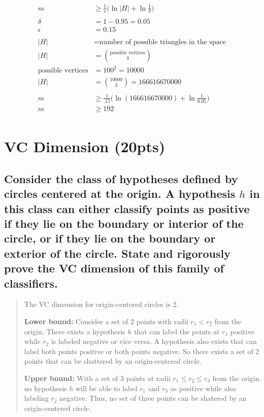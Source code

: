 \documentclass[11pt]{article}
\begin{document}
\begin{align*}
	m &\geq \frac{1}{\epsilon}\bigg(\ln \vert H \vert + \ln\frac{1}{\delta}\bigg)\\
	\\
	\delta &= 1-0.95 = 0.05\\
	\epsilon &= 0.15\\
	\\
	\vert H \vert &= \text{number of possible triangles in the space}\\
	\vert H \vert &= {{\text{possible vertices}}\choose{3}}\\
	\text{possible vertices} &= 100^2 = 10000\\
	\vert H \vert &= {{10000}\choose{3}}=166616670000\\
	\\
	m &\geq \frac{1}{.15}\bigg(\ln(166616670000) + \ln\frac{1}{0.05}\bigg)\\
	m &\geq 192\\
\end{align*}

\section{VC Dimension (20pts)}

\subsection{Consider the class of hypotheses defined by circles centered at the origin. A hypothesis $h$ in this class can either classify points as positive if they lie on the boundary or interior of the circle, or if they lie on the boundary or exterior of the circle. State and rigorously prove the VC dimension of this family of classifiers.}
\begin{quote}

	\vspace{3 mm}

	The VC dimension for origin-centered circles is 2.
	
	\vspace{1 mm}

	\textbf{Lower bound:} Consider a set of 2 points with radii $r_1 < r_2$ from the origin. There exists a hypothesis $h$ that can label the points at $r_1$ positive while $r_2$ is labeled negative or vice versa. A hypothesis also exists that can label both points positive or both points negative. So there exists a set of 2 points that can be shattered by an origin-centered circle. 
	
	\vspace{1 mm}

	\textbf{Upper bound:} With a set of 3 points at radii $r_1 \leq r_2 \leq r_3$ from the origin no hypothesis $h$ will be able to label $r_1$ and $r_3$ as positive while also labeling $r_2$ negative. Thus, no set of three points can be shatered by an origin-centered circle.
\end{quote}
\end{document}
